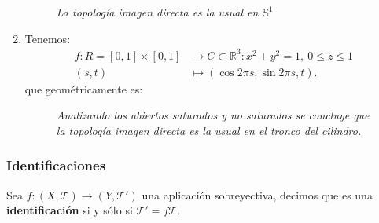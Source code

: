 \begin{ej}
\begin{enumerate}
\begin{figure}[H]
        \caption{\textit{La topología imagen directa es la usual en $\mathbb{S}^1$}}
        \label{fig:proyeccion_exponencial_img_directa}
    \end{figure}

    \item Tenemos:
    \begin{align*}
        f: R = \left[ 0, 1 \right] \times \left[ 0, 1 \right] &\rightarrow C \subset \mathbb{R}^3: x^2 + y^2 = 1,\ 0 \le z \le 1\\
        \left( s, t \right) &\mapsto \left( \cos 2\pi s, \sin 2\pi s, t \right) 
    .\end{align*}
    que geométricamente es:
    \begin{figure}[H]
        \centering
        \caption{\textit{Analizando los abiertos saturados y no saturados se concluye que la topología imagen directa es la usual en el tronco del cilindro.}}
        \label{fig:rectángulo-a-cilindro-por-imagen-directa.}
    \end{figure}
\end{enumerate}
\end{ej}

\subsubsection*{Identificaciones}
\begin{defi}[Identificación]
Sea $f: \left( X, \mathcal{T} \right) \rightarrow \left( Y, \mathcal{T}' \right)$ una aplicación sobreyectiva, decimos que es una \textbf{identificación} si y sólo si $\mathcal{T}' = f\mathcal{T}$.
\end{defi}

